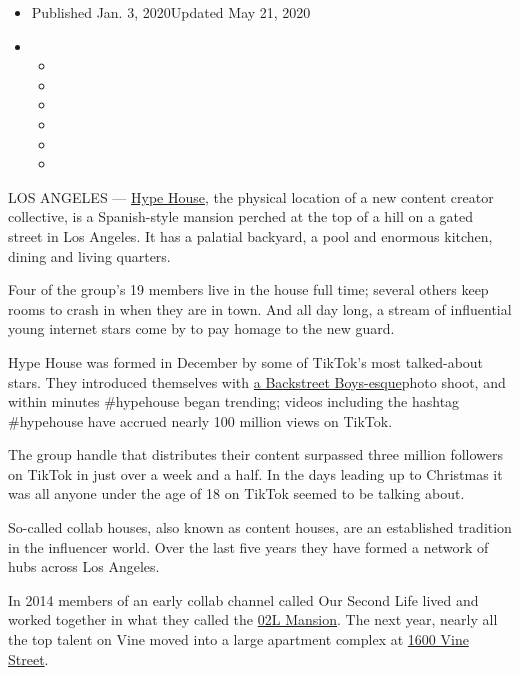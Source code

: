 \begin{itemize}
\item
  Published Jan. 3, 2020Updated May 21, 2020
\item
  \begin{itemize}
  \item
  \item
  \item
  \item
  \item
  \item
  \end{itemize}
\end{itemize}

LOS ANGELES --- \href{https://vm.tiktok.com/CpHWv4/}{Hype House}, the
physical location of a new content creator collective, is a
Spanish-style mansion perched at the top of a hill on a gated street in
Los Angeles. It has a palatial backyard, a pool and enormous kitchen,
dining and living quarters.

Four of the group's 19 members live in the house full time; several
others keep rooms to crash in when they are in town. And all day long, a
stream of influential young internet stars come by to pay homage to the
new guard.

Hype House was formed in December by some of TikTok's most talked-about
stars. They introduced themselves with
\href{https://www.instagram.com/p/B6gMaDaldmf/}{a Backstreet
Boys-esque}photo shoot, and within minutes \#hypehouse began trending;
videos including the hashtag \#hypehouse have accrued nearly 100 million
views on TikTok.

The group handle that distributes their content surpassed three million
followers on TikTok in just over a week and a half. In the days leading
up to Christmas it was all anyone under the age of 18 on TikTok seemed
to be talking about.

So-called collab houses, also known as content houses, are an
established tradition in the influencer world. Over the last five years
they have formed a network of hubs across Los Angeles.

In 2014 members of an early collab channel called Our Second Life lived
and worked together in what they called the
\href{https://www.youtube.com/watch?v=2aVoaohvQK8}{02L Mansion}. The
next year, nearly all the top talent on Vine moved into a large
apartment complex at
\href{https://www.nytimes3xbfgragh.onion/2017/12/30/business/hollywood-apartment-social-media.html}{1600
Vine Street}.

